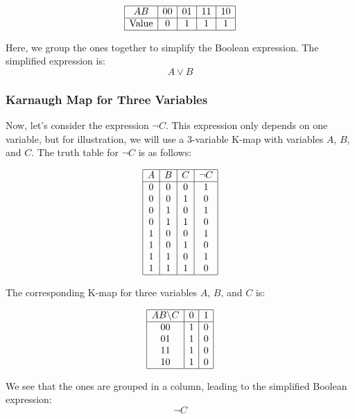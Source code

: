 \[
	\begin{array}{|c|c|c|c|c|}
		\hline
		AB           & 00 & 01 & 11 & 10 \\
		\hline
		\text{Value} & 0  & 1  & 1  & 1  \\
		\hline
	\end{array}
\]

Here, we group the ones together to simplify the Boolean expression. The simplified expression is:
\[
	A \lor B
\]

\subsubsection*{Karnaugh Map for Three Variables}

Now, let's consider the expression \( \neg C \). This expression only depends on one variable, but for illustration, we will use a 3-variable K-map with variables \( A \), \( B \), and \( C \).
\newline
The truth table for \( \neg C \) is as follows:

\[
	\begin{array}{|c|c|c|c|}
		\hline
		A & B & C & \neg C \\
		\hline
		0 & 0 & 0 & 1      \\
		0 & 0 & 1 & 0      \\
		0 & 1 & 0 & 1      \\
		0 & 1 & 1 & 0      \\
		1 & 0 & 0 & 1      \\
		1 & 0 & 1 & 0      \\
		1 & 1 & 0 & 1      \\
		1 & 1 & 1 & 0      \\
		\hline
	\end{array}
\]

The corresponding K-map for three variables \( A \), \( B \), and \( C \) is:

\[
	\begin{array}{|c|c|c|c|}
		\hline
		AB \backslash C & 0 & 1 \\
		\hline
		00              & 1 & 0 \\
		01              & 1 & 0 \\
		11              & 1 & 0 \\
		10              & 1 & 0 \\
		\hline
	\end{array}
\]

We see that the ones are grouped in a column, leading to the simplified Boolean expression:
\[
	\neg C
\]

